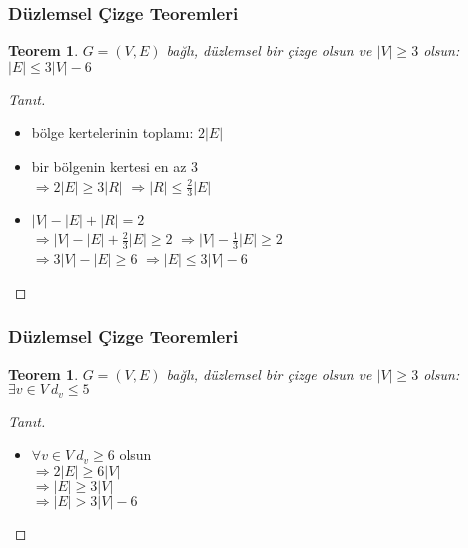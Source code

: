 \documentclass[dvipsnames]{beamer}
\theoremstyle{definition}
\theoremstyle{example}
\theoremstyle{plain}
\newtheorem{teorem}[theorem]{Teorem}
\begin{document}
\begin{frame}
  \frametitle{Düzlemsel Çizge Teoremleri}

  \begin{teorem}
    $G=(V,E)$ bağlı, düzlemsel bir çizge olsun ve $|V| \geq 3$ olsun:\\
    $|E| \leq 3 |V| - 6$
  \end{teorem}

  \pause
  \begin{proof}[Tanıt]
    \begin{itemize}
      \item bölge kertelerinin toplamı: $2 |E|$

      \pause
      \item bir bölgenin kertesi en az $3$\\
        \pause
        $\Rightarrow 2 |E| \geq 3 |R|$
        \pause
        $\Rightarrow |R| \leq \frac{2}{3} |E|$

      \pause
      \item $|V| - |E| + |R| = 2$\\
        \pause
        $\Rightarrow |V| - |E| + \frac{2}{3} |E| \geq 2$
        \pause
        $\Rightarrow |V| - \frac{1}{3} |E| \geq 2$\\
        \pause
        $\Rightarrow 3 |V| - |E| \geq 6$
        \pause
        $\Rightarrow |E| \leq 3 |V| - 6$\\
    \end{itemize}
  \end{proof}
\end{frame}

\begin{frame}
  \frametitle{Düzlemsel Çizge Teoremleri}

  \begin{teorem}
    $G=(V,E)$ bağlı, düzlemsel bir çizge olsun ve $|V| \geq 3$ olsun:\\
    $\exists v \in V~d_v \leq 5$
  \end{teorem}

  \pause
  \begin{proof}[Tanıt]
    \begin{itemize}
      \item $\forall v \in V~d_v \geq 6$ olsun\\
        \pause
        $\Rightarrow 2 |E| \geq 6 |V|$\\
        \pause
        $\Rightarrow |E| \geq 3 |V|$\\
        \pause
        $\Rightarrow |E| > 3 |V| - 6$
    \end{itemize}
  \end{proof}
\end{frame}
\end{document}
